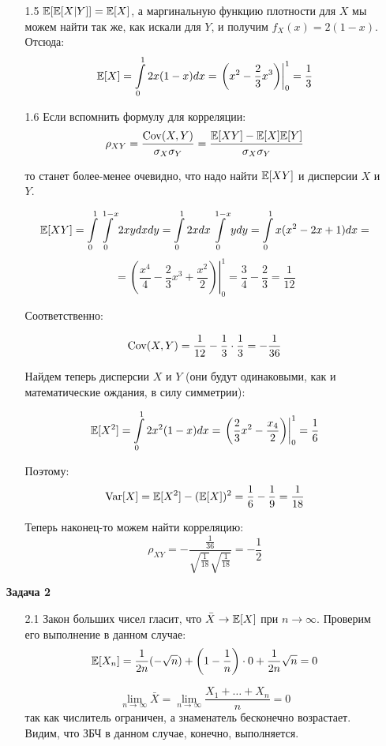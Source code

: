 \documentclass[12pt, a4paper]{article}\usepackage[]{graphicx}\usepackage[]{color}
\begin{document}
\begin{enumerate}
\begin{enumerate}
\item[1.5] $\mathbb{E}[\mathbb{E}[X|Y]] = \mathbb{E}[X]$, а маргинальную функцию плотности для $X$ мы можем найти так же, как искали для $Y$, и получим $f_X(x) = 2(1-x)$. Отсюда:
$$
\mathbb{E}[X] = \int \limits_{0}^{1} 2x(1-x)dx = \left .\left(x^2 - \frac{2}{3}x^3\right) \right|^{1}_{0} = \frac{1}{3}
$$

\item[1.6] Если вспомнить формулу для корреляции:
$$
\rho_{XY} = \frac{\operatorname{Cov}(X, Y)}{\sigma_X\sigma_Y}  = \frac{\mathbb{E}[XY] - \mathbb{E}[X]\mathbb{E}[Y]}{\sigma_X\sigma_Y}
$$

то станет более-менее очевидно, что надо найти $\mathbb{E}[XY]$ и дисперсии $X$ и $Y$.

$$
\mathbb{E}[XY] = \int \limits_{0}^{1} \int \limits_{0}^{1-x} 2xy dxdy = \int \limits_{0}^{1} 2xdx \int \limits_{0}^{1-x}ydy =  \int \limits_{0}^{1}x(x^2-2x+1)dx =
$$
$$
= \left. \left(\frac{x^4}{4} - \frac{2}{3}x^3 + \frac{x^2}{2}\right) \right|^{1}_{0} = \frac{3}{4}-\frac{2}{3} = \frac{1}{12}
$$

Соответственно:

$$
\operatorname{Cov}(X, Y) = \frac{1}{12} - \frac{1}{3}\cdot \frac{1}{3} = -\frac{1}{36}
$$

Найдем теперь дисперсии $X$ и $Y$ (они будут одинаковыми, как и математические ождания, в силу симметрии):

$$
\mathbb{E}[X^2] = \int \limits_{0}^{1} 2x^2(1-x)dx = \left. \left( \frac{2}{3}x^2 - \frac{x_4}{2} \right) \right|_{0}^{1} = \frac{1}{6}
$$

Поэтому:
$$
\operatorname{Var}[X] = \mathbb{E}[X^2] - (\mathbb{E}[X])^2 = \frac{1}{6} - \frac{1}{9} = \frac{1}{18}
$$

Теперь наконец-то можем найти корреляцию:
$$
\rho_{XY} = -\frac{\frac{1}{36}}{\sqrt{\frac{1}{18}}\sqrt{\frac{1}{18}}} = -\frac{1}{2}
$$
\end{enumerate}

\item[\textbf{Задача 2}]

\begin{enumerate}


\item[2.1] Закон больших чисел гласит, что $\bar{X} \rightarrow
\mathbb{E}[X]$ при $n\rightarrow \infty$. Проверим его выполнение в данном случае:
$$
\mathbb{E}[X_n] = \frac{1}{2n}(-\sqrt{n}) + \left(1-\frac{1}{n}\right)\cdot0 + \frac{1}{2n}\sqrt{n} = 0
$$

$$
\lim\limits_{n\rightarrow\infty} \bar{X} = \lim\limits_{n\rightarrow\infty} \frac{X_1 +\dots + X_n}{n} = 0
$$
так как числитель ограничен, а знаменатель бесконечно возрастает.
Видим, что ЗБЧ в данном случае, конечно, выполняется.


\end{enumerate}
\end{enumerate}
\end{document}
